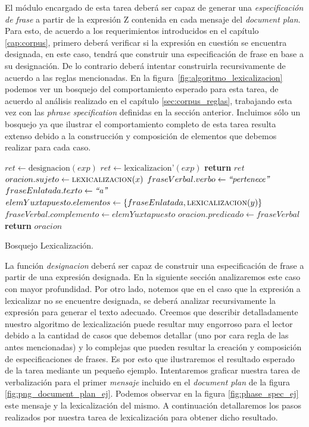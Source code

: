 El módulo encargado de esta tarea deberá ser capaz de generar una \emph{especificación de frase} a partir de la expresión Z contenida en cada mensaje del \emph{document plan}. Para esto, de acuerdo a los requerimientos introducidos en el capítulo \ref{cap:corpus}, primero deberá verificar si la expresión en cuestión se encuentra designada, en este caso, tendrá que construir una especificación de frase en base a su designación. De lo contrario deberá intentar construirla recursivamente de acuerdo a las reglas mencionadas. En la figura~\ref{fig:algoritmo_lexicalizacion} podemos ver un bosquejo del comportamiento esperado para esta tarea, de acuerdo al análisis realizado en el capítulo \ref{sec:corpus_reglas}, trabajando esta vez con las \emph{phrase specification} definidas en la sección anterior. Incluimos sólo un bosquejo ya que ilustrar el comportamiento completo de esta tarea resulta extenso debido a la construcción y composición de elementos que debemos realizar para cada caso. 

\begin{algorithm}[H]
\begin{algorithmic}
\State $ret\gets \text{designacion}(exp)$
\Else
\State $ret\gets \text{lexicalizacion'}(exp)$
\EndIf
\State \textbf{return} $ret$
\EndFunction
\Statex
{}
\State $oracion.sujeto\gets \Call{lexicalizacion}{x}$
\State $fraseVerbal.verbo\gets \text{\textit{``pertenece''}}$
\State $fraseEnlatada.texto\gets \text{\textit{``a''}}$
\State $elemYuxtapuesto.elementos\gets \{fraseEnlatada, \Call{lexicalizacion}{y}\}$
\State $fraseVerbal.complemento\gets elemYuxtapuesto$
\State $oracion.predicado\gets fraseVerbal$
\State \textbf{return} $oracion$
\EndFunction
\end{algorithmic}
\caption{Bosquejo Lexicalización.}
\label{fig:algoritmo_lexicalizacion}
\end{algorithm}

La función \emph{designacion} deberá ser capaz de construir una especificación de frase a partir de una expresión designada. En la siguiente sección analizaremos este caso con mayor profundidad. Por otro lado, notemos que en el caso que la expresión a lexicalizar no se encuentre designada, se deberá analizar recursivamente la expresión para generar el texto adecuado. Creemos que describir detalladamente nuestro algoritmo de lexicalización puede resultar muy engorroso para el lector debido a la cantidad de casos que debemos detallar (uno por cara regla de las antes mencionadas) y lo complejas que pueden resultar la creación y composición de especificaciones de frases. Es por esto que ilustraremos el resultado esperado de la tarea mediante un pequeño ejemplo. Intentaremos graficar nuestra tarea de verbalización para el primer \emph{mensaje} incluido en el \textit{document plan} de la figura \ref{fig:png_document_plan_ej}. Podemos observar en la figura \ref{fig:phase_spec_ej} este mensaje y la lexicalización del mismo. A continuación detallaremos los pasos realizados por nuestra tarea de lexicalización para obtener dicho resultado.

